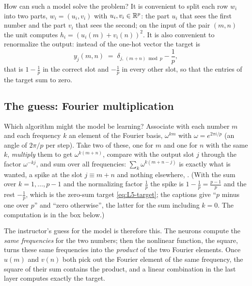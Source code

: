 How can such a model solve the problem? It is convenient to split each row $w_i$ into two parts, $w_i=(u_i,v_i)$ with $u_i,v_i\in\mathbb{R}^p$: the part $u_i$ that sees the first number and the part $v_i$ that sees the second; on the input of the pair $(m,n)$ the unit computes $h_i=(u_i(m)+v_i(n))^2$. It is also convenient to renormalize the output: instead of the one-hot vector the target is
\begin{equation}\label{eq:L5-target}
  y_j(m,n)\;=\;\delta_{j,\,(m+n)\bmod p}-\frac1p,
\end{equation}
that is $1-\frac1p$ in the correct slot and $-\frac1p$ in every other slot, so that the entries of the target sum to zero.

\subsection{The guess: Fourier multiplication}\label{sec:L5-fourier}
Which algorithm might the model be learning? Associate with each number $m$ and each frequency $k$ an element of the Fourier basis, $\omega^{km}$ with $\omega=e^{2\pi i/p}$ (an angle of $2\pi/p$ per step). Take two of these, one for $m$ and one for $n$ with the same $k$, \emph{multiply} them to get $\omega^{k(m+n)}$, compare with the output slot $j$ through the factor $\omega^{-kj}$, and sum over all frequencies: $\sum_k\omega^{k(m+n-j)}$ is exactly what is wanted, a spike at the slot $j\equiv m+n$ and nothing elsewhere, . (With the sum over $k=1,\dots,p-1$ and the normalizing factor $\frac1p$ the spike is $1-\frac1p=\frac{p-1}p$ and the rest $-\frac1p$, which is the zero-sum target \eqref{eq:L5-target}; the captions give ``$p$ minus one over $p$'' and ``zero otherwise'', the latter for the sum including $k=0$. The computation is in the box below.)

The instructor's guess for the model is therefore this. The neurons compute the \emph{same frequencies} for the two numbers; then the nonlinear function, the square, turns these same frequencies into the \emph{product} of the two Fourier elements. Once $u(m)$ and $v(n)$ both pick out the Fourier element of the same frequency, the square of their sum contains the product, and a linear combination in the last layer computes exactly the target.

